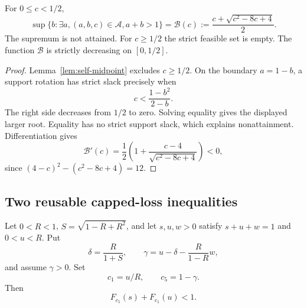 \begin{lemma}
\label{lem:free-supercritical-envelope}
For $0\le c<1/2$,
\[
 \sup\{b:\exists a, (a,b,c)\in\mathcal A, a+b>1\}
 =\mathcal B(c):=\frac{c+\sqrt{c^2-8c+4}}2.
\]
The supremum is not attained.  For $c\ge1/2$ the strict feasible set is
empty.  The function $\mathcal B$ is strictly decreasing on $[0,1/2]$.
\end{lemma}

\begin{proof}
Lemma~\ref{lem:self-midpoint} excludes $c\ge1/2$.  On the boundary
$a=1-b$, a support rotation has strict slack precisely when
\[
 c<\frac{1-b^2}{2-b}.
\]
The right side decreases from $1/2$ to zero.  Solving equality gives the
displayed larger root.  Equality has no strict support slack, which explains
nonattainment.  Differentiation gives
\[
 \mathcal B'(c)=\frac12\left(1+\frac{c-4}{\sqrt{c^2-8c+4}}\right)<0,
\]
since $(4-c)^2-(c^2-8c+4)=12$.
\end{proof}

\subsection{Two reusable capped-loss inequalities}

\begin{lemma}
\label{lem:one-side-capped-loss}
Let $0<R<1$, $S=\sqrt{1-R+R^2}$, and let $s,u,w>0$ satisfy
$s+u+w=1$ and $0<u<R$.  Put
\[
 \delta=\frac{R}{1+S},\qquad
 \gamma=u-\delta-\frac{R}{1-R}w,
\]
and assume $\gamma>0$.  Set
\[
 c_1=u/R,\qquad c_5=1-\gamma.
\]
Then
\begin{equation}
 F_{c_5}(s)+F_{c_1}(u)<1.
 \label{eq:one-side-loss}
\end{equation}
\end{lemma}

